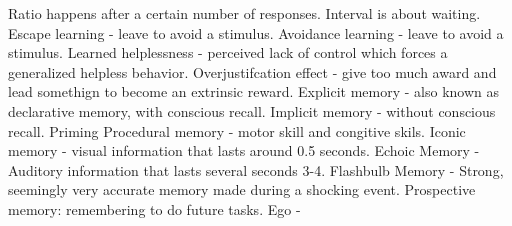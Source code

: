 {}\markdownRendererUlBeginTight
\markdownRendererUlItem Ratio happens after a certain number of responses.\markdownRendererUlItemEnd 
\markdownRendererUlItem Interval is about waiting.\markdownRendererUlItemEnd 
\markdownRendererUlEndTight \markdownRendererUlItemEnd 
\markdownRendererUlItem Escape learning - leave to avoid a stimulus.\markdownRendererUlItemEnd 
\markdownRendererUlItem Avoidance learning - leave to avoid a stimulus.\markdownRendererUlItemEnd 
\markdownRendererUlItem Learned helplessness - perceived lack of control which forces a generalized helpless behavior.\markdownRendererUlItemEnd 
\markdownRendererUlItem Overjustifcation effect - give too much award and lead somethign to become an extrinsic reward.\markdownRendererUlItemEnd 
\markdownRendererUlEndTight \markdownRendererInterblockSeparator
{}\markdownRendererInterblockSeparator
{}\markdownRendererUlBeginTight
\markdownRendererUlItem Explicit memory - also known as declarative memory, with conscious recall.\markdownRendererUlItemEnd 
\markdownRendererUlItem Implicit memory - without conscious recall.\markdownRendererUlItemEnd 
\markdownRendererUlItem Priming\markdownRendererUlItemEnd 
\markdownRendererUlItem Procedural memory - motor skill and congitive skils.\markdownRendererUlItemEnd 
\markdownRendererUlItem Iconic memory - visual information that lasts around 0.5 seconds.\markdownRendererUlItemEnd 
\markdownRendererUlItem Echoic Memory - Auditory information that lasts several seconds 3-4.\markdownRendererUlItemEnd 
\markdownRendererUlItem Flashbulb Memory - Strong, seemingly very accurate memory made during a shocking event.\markdownRendererUlItemEnd 
\markdownRendererUlItem Prospective memory: remembering to do future tasks.\markdownRendererUlItemEnd 
\markdownRendererUlEndTight \markdownRendererInterblockSeparator
{}\markdownRendererInterblockSeparator
{}\markdownRendererInterblockSeparator
{}\markdownRendererUlBeginTight
\markdownRendererUlItem Ego -\markdownRendererUlItemEnd 
\markdownRendererUlEndTight \relax